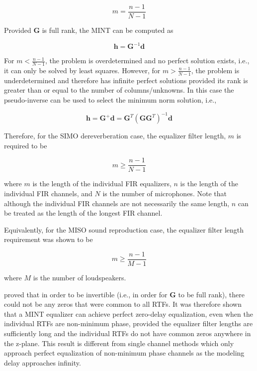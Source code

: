 \begin{equation}
	m = \frac{n-1}{N-1}
\end{equation}

\noindent
Provided $\boldsymbol{G}$ is full rank, the MINT can be computed as

\begin{equation}
	\boldsymbol{h} = \boldsymbol{G}^{-1}\boldsymbol{d}
\end{equation}

For $m < \frac{n-1}{N-1}$, the problem is overdetermined and no perfect solution exists, i.e., it can only be solved by least squares. However, for $m > \frac{n-1}{N-1}$, the problem is underdetermined and therefore has infinite perfect solutions provided its rank is greater than or equal to the number of columns/unknowns. In this case the pseudo-inverse can be used to select the minimum norm solution, i.e.,

\begin{equation}
	\boldsymbol{h} = \boldsymbol{G}^+\boldsymbol{d} = \boldsymbol{G}^T(\boldsymbol{G}\boldsymbol{G}^T)^{-1}\boldsymbol{d}
\end{equation}


 Therefore, for the SIMO dereverberation case, the equalizer filter length, $m$ is required to be

\begin{equation}
	m \ge \frac{n-1}{N-1}
\end{equation}

\noindent
where $m$ is the length of the individual FIR equalizers, $n$ is the length of the individual FIR channels, and $N$ is the number of microphones. Note that although the individual FIR channels are not necessarily the same length, $n$ can be treated as the length of the longest FIR channel.

Equivalently, for the MISO sound reproduction case, the equalizer filter length requirement was shown to be

\begin{equation}
	m \ge \frac{n-1}{M-1}
\end{equation}

\noindent
where $M$ is the number of loudspeakers.


 \cite{miyoshi1986inverse} proved that in order to be invertible (i.e., in order for $\boldsymbol{G}$ to be full rank), there could not be any zeros that were common to all RTFs. It was therefore shown that a MINT equalizer can achieve perfect zero-delay equalization, even when the individual RTFs are non-minimum phase, provided the equalizer filter lengths are sufficiently long and the individual RTFs do not have common zeros anywhere in the z-plane. This result is different from single channel methods which only approach perfect equalization of non-minimum phase channels as the modeling delay approaches infinity. 
 
